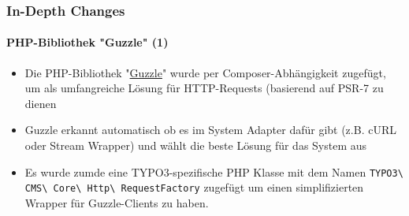 \begin{frame}[fragile]
	\frametitle{In-Depth Changes}
	\framesubtitle{PHP-Bibliothek "Guzzle" (1)}

	\begin{itemize}

		\item Die PHP-Bibliothek
			"\href{http://docs.guzzlephp.org}{Guzzle}"
			wurde per Composer-Abhängigkeit zugefügt, um als umfangreiche Lösung für HTTP-Requests (basierend auf PSR-7 zu dienen

		\item Guzzle erkannt automatisch ob es im System Adapter dafür gibt (z.B. cURL oder Stream Wrapper) und wählt die beste Lösung für das System aus

		\item Es wurde zumde eine TYPO3-spezifische PHP Klasse mit dem Namen 
			\texttt{TYPO3\textbackslash
				CMS\textbackslash
				Core\textbackslash
				Http\textbackslash
				RequestFactory}\newline
			zugefügt um einen simplifizierten Wrapper für Guzzle-Clients zu haben.

	\end{itemize}

\end{frame}


